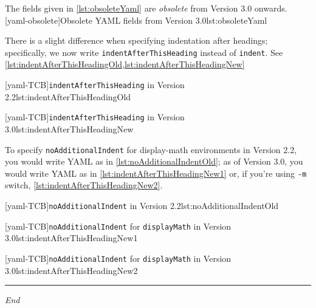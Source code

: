   The fields given in \cref{lst:obsoleteYaml} are \emph{obsolete} from Version 3.0
  onwards.
  [yaml-obsolete]{Obsolete YAML fields from Version 3.0}{lst:obsoleteYaml}

  There is a slight difference when specifying indentation after headings; specifically,
  we now write \texttt{indentAfterThisHeading} instead of \texttt{indent}. See
  \cref{lst:indentAfterThisHeadingOld,lst:indentAfterThisHeadingNew}

  \begin{minipage}{.45\textwidth}
   [yaml-TCB]{\texttt{indentAfterThisHeading} in Version 2.2}{lst:indentAfterThisHeadingOld}
  \end{minipage}%
  \hfill
  \begin{minipage}{.45\textwidth}
   [yaml-TCB]{\texttt{indentAfterThisHeading} in Version 3.0}{lst:indentAfterThisHeadingNew}
  \end{minipage}%

  To specify \texttt{noAdditionalIndent} for display-math environments in Version 2.2,
  you would write YAML as in \cref{lst:noAdditionalIndentOld}; as of Version 3.0, you
  would write YAML as in \cref{lst:indentAfterThisHeadingNew1} or, if you're using
  \texttt{-m} switch, \cref{lst:indentAfterThisHeadingNew2}.

  \begin{minipage}{.45\textwidth}
   [yaml-TCB]{\texttt{noAdditionalIndent} in Version 2.2}{lst:noAdditionalIndentOld}
  \end{minipage}%
  \hfill
  \begin{minipage}{.45\textwidth}
   [yaml-TCB]{\texttt{noAdditionalIndent} for \texttt{displayMath} in Version 3.0}{lst:indentAfterThisHeadingNew1}

   [yaml-TCB]{\texttt{noAdditionalIndent} for \texttt{displayMath} in Version 3.0}{lst:indentAfterThisHeadingNew2}
  \end{minipage}%

  \mbox{}\hfill
  \begin{minipage}{.25\textwidth}
   \hrule

   \hfill\itshape End\\\mbox{}\hfill\mbox{}

  \end{minipage}
